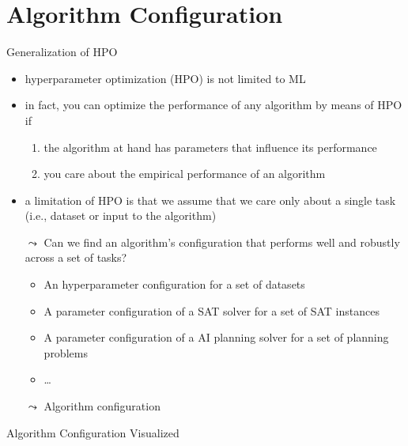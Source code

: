 \section{Algorithm Configuration}
\begin{frame}[c]{Generalization of HPO}

\begin{itemize}
	\item hyperparameter optimization (HPO) is not limited to ML
	\pause
	\item in fact, you can optimize the performance of any algorithm by means of HPO if
	\begin{enumerate}
		\item the algorithm at hand has parameters that influence its performance
		\item you care about the empirical performance of an algorithm
	\end{enumerate}
	\pause
 	\smallskip
 	\item a limitation of HPO is that we assume that we care only about a single task (i.e., dataset or input to the algorithm)
 	\smallskip
 	\item[$\leadsto$] \alert{Can we find an algorithm's configuration that performs well and robustly across a set of tasks?}
 	\begin{itemize}
 		\item An hyperparameter configuration for a set of datasets
 		\item A parameter configuration of a SAT solver for a set of SAT instances
 		\item A parameter configuration of a AI planning solver for a set of planning problems
 		\item \ldots
 	\end{itemize}
 	\item[$\leadsto$] \alert{Algorithm configuration}
\end{itemize}


\end{frame}
\begin{frame}[c]{Algorithm Configuration Visualized}

\centering
{}

\end{frame}

